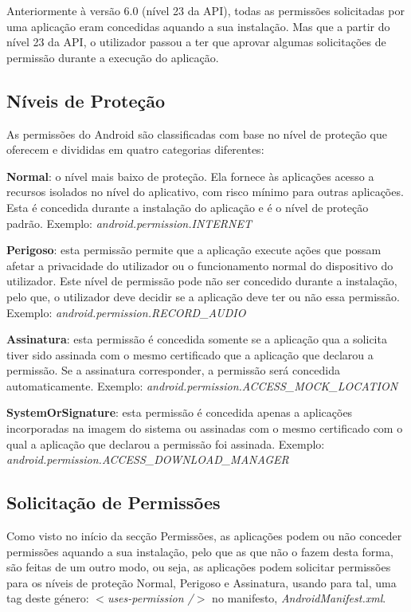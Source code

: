 Anteriormente à versão 6.0 (nível 23 da API), todas as permissões solicitadas por uma aplicação eram concedidas aquando a sua instalação. Mas que a partir do nível 23 da API, o utilizador passou a ter que aprovar algumas solicitações de permissão durante a execução do aplicação.


\subsection{Níveis de Proteção}
As permissões do Android são classificadas com base no nível de proteção que oferecem e divididas em quatro categorias diferentes:

\textbf{Normal}: o nível mais baixo de proteção. Ela fornece às aplicações acesso a recursos isolados no nível do aplicativo, com risco mínimo para outras aplicações. Esta é concedida durante a instalação do aplicação e é o nível de proteção padrão.
Exemplo: \textit{android.permission.INTERNET}

\textbf{Perigoso}: esta permissão permite que a aplicação execute ações que possam afetar a privacidade do utilizador ou o funcionamento normal do dispositivo do utilizador. Este nível de permissão pode não ser concedido durante a instalação, pelo que, o utilizador deve decidir se a aplicação deve ter ou não essa permissão.
Exemplo: \textit{android.permission.RECORD\_AUDIO}

\textbf{Assinatura}: esta permissão é concedida somente se a aplicação qua a solicita tiver sido assinada com o mesmo certificado que a aplicação que declarou a permissão. Se a assinatura corresponder, a permissão será concedida automaticamente.
Exemplo: \textit{android.permission.ACCESS\_MOCK\_LOCATION}

\textbf{SystemOrSignature}: esta permissão é concedida apenas a aplicações incorporadas na imagem do sistema ou assinadas com o mesmo certificado com o qual a aplicação que declarou a permissão foi assinada.
Exemplo: \textit{android.permission.ACCESS\_DOWNLOAD\_MANAGER}


\subsection{Solicitação de Permissões}
Como visto no início da secção Permissões, as aplicações podem ou não conceder permissões aquando a sua instalação, pelo que as que não o fazem desta forma, são feitas de um outro modo, ou seja, as aplicações podem solicitar permissões para os níveis de proteção Normal, Perigoso e Assinatura, usando para tal, uma tag deste género: \textit{$<$uses-permission /$>$} no manifesto, \textit{AndroidManifest.xml}.



